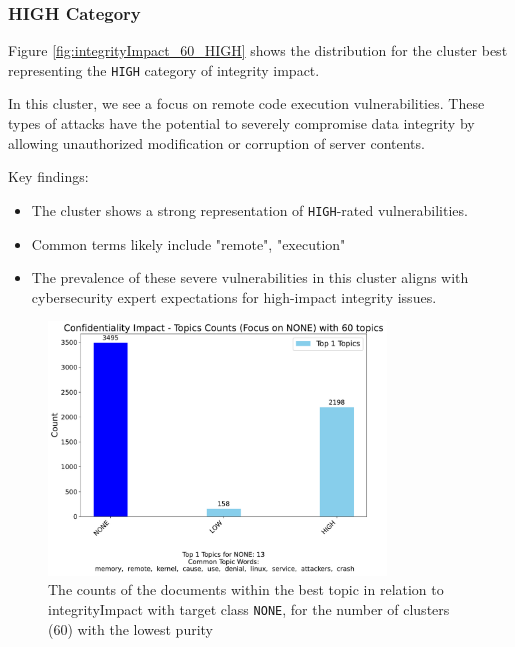 \documentclass[12pt]{article}
\begin{document}
\subsubsection*{HIGH Category}

Figure \ref{fig:integrityImpact_60_HIGH} shows the distribution for the cluster best representing the \texttt{HIGH} category of integrity impact.


In this cluster, we see a focus on remote code execution vulnerabilities. These
types of attacks have the potential to severely compromise data integrity by allowing unauthorized
modification or corruption of server contents.

Key findings:
\begin{itemize}

	\item The cluster shows a strong representation of \texttt{HIGH}-rated vulnerabilities.

	\item Common terms likely include "remote", "execution"

	\item The prevalence of these severe vulnerabilities in this cluster aligns with cybersecurity
	      expert expectations for high-impact integrity issues.

\end{itemize}

\begin{figure}[ht]
	\centering
	\includegraphics[width=0.8\textwidth]{figures/integrityImpact/integrityImpact_NONE_60_BAD.pdf}
	\caption{The counts of the documents within the best topic in relation to integrityImpact with
		target class \texttt{NONE}, for the number of clusters (60) with the lowest purity}
	\label{fig:integrityImpact_60_NONE_BAD}
\end{figure}
\end{document}
